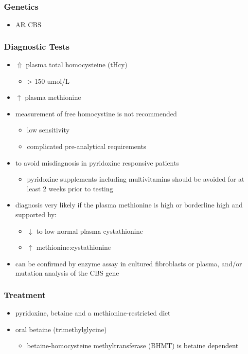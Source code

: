 \documentclass[12pt]{scrartcl}
\begin{document}
\begin{center}
\begin{center}
\subsubsection{Genetics}
\label{sec:orgd7d0e03}
\begin{itemize}
\item AR CBS
\end{itemize}

\subsubsection{Diagnostic Tests}
\label{sec:org181f2c0}
\begin{itemize}
\item \(\Uparrow\) plasma total homocysteine (tHcy)
\begin{itemize}
\item \textgreater{} 150 umol/L
\end{itemize}
\item \(\uparrow\) plasma methionine
\item measurement of free homocystine is not recommended
\begin{itemize}
\item low sensitivity
\item complicated pre-analytical requirements
\end{itemize}
\item to avoid misdiagnosis in pyridoxine responsive patients
\begin{itemize}
\item pyridoxine supplements including multivitamins should be avoided
for at least 2 weeks prior to testing
\end{itemize}
\item diagnosis very likely if the plasma methionine is high or borderline
high and supported by:
\begin{itemize}
\item \(\downarrow\) to low-normal plasma cystathionine
\item \(\uparrow\) methionine:cystathionine
\end{itemize}
\item can be confirmed by enzyme assay in cultured fibroblasts or plasma,
and/or mutation analysis of the CBS gene
\end{itemize}

\subsubsection{Treatment}
\label{sec:orgd284e8e}
\begin{itemize}
\item pyridoxine, betaine and a methionine-restricted diet
\item oral betaine (trimethylglycine)
\begin{itemize}
\item betaine-homocysteine methyltransferase (BHMT) is betaine dependent
\end{itemize}
\end{itemize}


\end{center}
\end{center}
\end{document}
